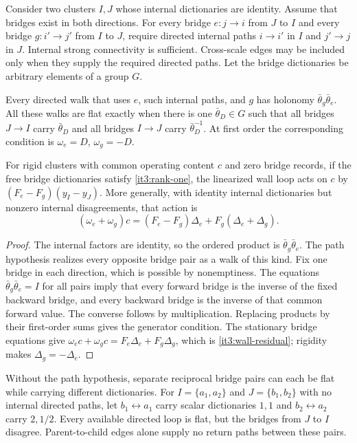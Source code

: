 \documentclass[11pt,letterpaper]{report}
\begin{document}
Consider two clusters $I,J$ whose internal dictionaries are identity. Assume that bridges exist in both directions. For every bridge $e:j\to i$ from $J$ to $I$ and every bridge $g:i'\to j'$ from $I$ to $J$, require directed internal paths $i\to i'$ in $I$ and $j'\to j$ in $J$. Internal strong connectivity is sufficient. Cross-scale edges may be included only when they supply the required directed paths. Let the bridge dictionaries be arbitrary elements of a group $G$.

Every directed walk that uses $e$, such internal paths, and $g$ has holonomy $\bar\theta_g\bar\theta_e$. All these walks are flat exactly when there is one $\bar\theta_D\in G$ such that all bridges $J\to I$ carry $\bar\theta_D$ and all bridges $I\to J$ carry $\bar\theta_D^{-1}$. At first order the corresponding condition is $\omega_e=D$, $\omega_g=-D$.

For rigid clusters with common operating content $c$ and zero bridge records, if the free bridge dictionaries satisfy \cref{it3:rank-one}, the linearized wall loop acts on $c$ by $(F_e-F_g)(y_I-y_J)$. More generally, with identity internal dictionaries but nonzero internal disagreements, that action is
\begin{equation}
(\omega_e+\omega_g)c
=(F_e-F_g)\Delta_e+F_g(\Delta_e+\Delta_g).
\label{it3:wall-residual}
\end{equation}
\begin{proof}
The internal factors are identity, so the ordered product is $\bar\theta_g\bar\theta_e$. The path hypothesis realizes every opposite bridge pair as a walk of this kind. Fix one bridge in each direction, which is possible by nonemptiness. The equations $\bar\theta_g\bar\theta_e=I$ for all pairs imply that every forward bridge is the inverse of the fixed backward bridge, and every backward bridge is the inverse of that common forward value. The converse follows by multiplication. Replacing products by their first-order sums gives the generator condition. The stationary bridge equations give
$\omega_ec+\omega_gc=F_e\Delta_e+F_g\Delta_g$, which is \cref{it3:wall-residual}; rigidity makes $\Delta_g=-\Delta_e$.
\end{proof}

Without the path hypothesis, separate reciprocal bridge pairs can each be flat while carrying different dictionaries. For $I=\{a_1,a_2\}$ and $J=\{b_1,b_2\}$ with no internal directed paths, let $b_1\leftrightarrow a_1$ carry scalar dictionaries $1,1$ and $b_2\leftrightarrow a_2$ carry $2,1/2$. Every available directed loop is flat, but the bridges from $J$ to $I$ disagree. Parent-to-child edges alone supply no return paths between these pairs.
\end{document}
